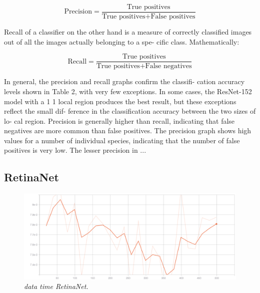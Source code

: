 \begin{equation}
\text{Precision} = \frac{\text{True positives}}{\text{True positives} + \text{False positives}}
\end{equation}

Recall of a classifier on the other hand is a measure of correctly classified images out of all the images actually belonging to a spe- cific class. Mathematically:

\begin{equation}
\text{Recall} = \frac{\text{True positives}}{\text{True positives} + \text{False negatives}}
\end{equation}

In general, the precision and recall graphs confirm the classifi- cation accuracy levels shown in Table 2, with very few exceptions. In some cases, the ResNet-152 model with a 1 1 local region produces the best result, but these exceptions reflect the small dif- ference in the classification accuracy between the two sizes of lo- cal region. Precision is generally higher than recall, indicating that false negatives are more common than false positives. The precision graph shows high values for a number of individual species, indicating that the number of false positives is very low. The lesser precision in ...

\subsection{RetinaNet}

\begin{figure}[h!]
\begin{center} 
\includegraphics[scale=0.35]{figures/data_time_retinanet_1}
\caption{\small \sl data time RetinaNet. \label{fig:data_time_retinanet}}
\end{center}
\end{figure}

